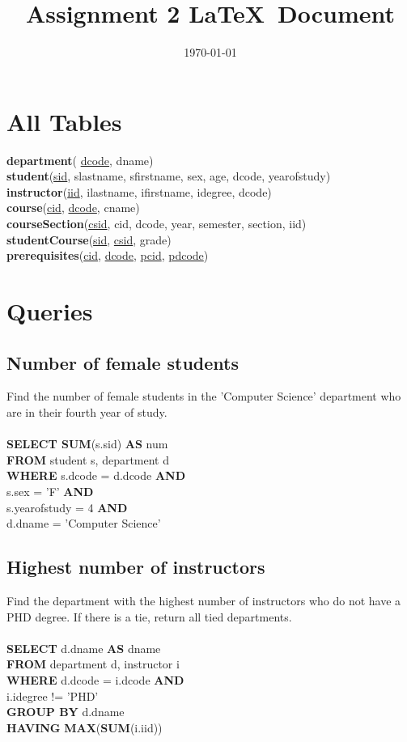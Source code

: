 \documentclass[11pt]{article}
\begin{document}
\title{Assignment 2 \LaTeX \ Document}
\date{\today}
\maketitle


\section{All Tables}
\textbf{department}( \underline{dcode}, dname)\\
\textbf{student}(\underline{sid}, slastname, sfirstname, sex, age, dcode, yearofstudy)\\
\textbf{instructor}(\underline{iid}, ilastname, ifirstname, idegree, dcode)\\
\textbf{course}(\underline{cid}, \underline{dcode},	cname)\\
\textbf{courseSection}(\underline{csid}, cid, dcode, year, semester, section, iid)\\
\textbf{studentCourse}(\underline{sid}, \underline{csid}, grade)\\
\textbf{prerequisites}(\underline{cid}, \underline{dcode}, \underline{pcid}, \underline{pdcode})

\section{Queries}

\subsection{Number of female students}
Find the number of female students in the 'Computer Science' department who are in their
fourth year of study.\\
~\\
\textbf{SELECT SUM}(s.sid) \textbf{AS} num\\
\textbf{FROM} student s, department d\\
\textbf{WHERE} s.dcode = d.dcode \textbf{AND}\\
s.sex = 'F' \textbf{AND}\\
s.yearofstudy = 4 \textbf{AND}\\
d.dname = 'Computer Science'

\subsection{Highest number of instructors}
Find the department with the highest number of instructors who do not have a PHD degree.
If there is a tie, return all tied departments.\\
~\\
\textbf{SELECT} d.dname \textbf{AS} dname\\
\textbf{FROM} department d, instructor i\\
\textbf{WHERE} d.dcode = i.dcode \textbf{AND}\\
i.idegree != 'PHD'\\
\textbf{GROUP BY} d.dname\\
\textbf{HAVING} \textbf{MAX}(\textbf{SUM}(i.iid))
\end{document}
